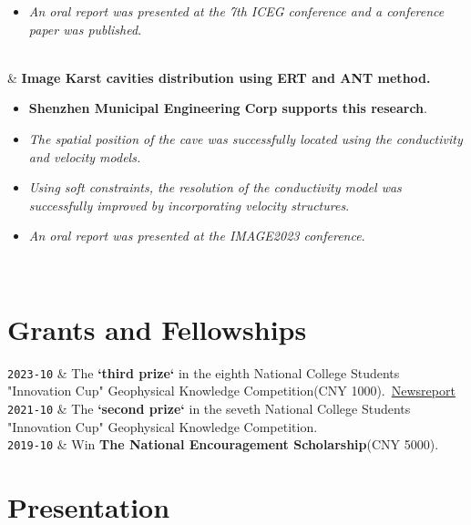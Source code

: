 \documentclass[10pt,a4paper]{article}
\newcommand{\Duration}[2]{\fontsize{10pt}{0}\selectfont \texttt{#1-#2}}
\begin{document}
\begin{EntriesTableYear}
\begin{itemize}[label={-}, leftmargin=*]
    \item \textit{An oral report was presented at the 7th ICEG conference and a conference paper was published}.
  \end{itemize}
  \\
  &
  \textbf{Image Karst cavities distribution using ERT and ANT method.} 
  \begin{itemize}[label={-}, leftmargin=*] 
    \item \textbf{Shenzhen Municipal Engineering Corp supports this research}.
    \item \textit{The spatial position of the cave was successfully located using the conductivity and velocity models.}
    \item \textit{Using soft constraints, the resolution of the conductivity model was successfully improved by incorporating velocity structures}.
    \item \textit{An oral report was presented at the IMAGE2023 conference}.
  \end{itemize}
  \\
\end{EntriesTableYear}

\section{Grants and Fellowships}

\begin{EntriesTableDuration}
  \Duration{2023}{10} &
  The\textbf{ `third prize`} in the eighth National College Students "Innovation Cup" Geophysical Knowledge Competition(CNY 1000).\
  \href{https://newshub.sustech.edu.cn/html/202306/43985.html}{Newsreport}
  \\
  \Duration{2021}{10} &
  The\textbf{ `second prize`} in the seveth National College Students "Innovation Cup" Geophysical Knowledge Competition.
  \\
  \Duration{2019}{10} &
  Win\textbf{ The National Encouragement Scholarship}(CNY 5000).
  \\
\end{EntriesTableDuration}

\section{Presentation}
\end{document}
